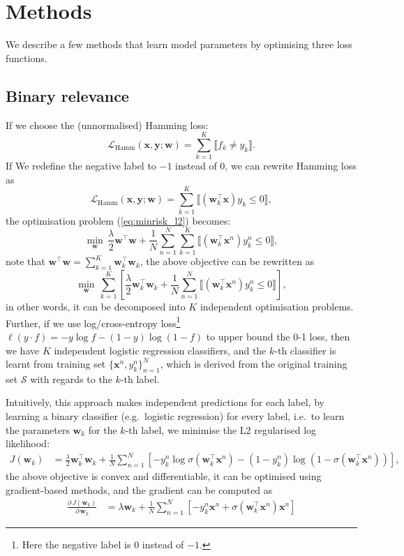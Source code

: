 \documentclass[9pt]{extarticle}
\newcommand{\llb}{\llbracket}
\newcommand{\rrb}{\rrbracket}
\newcommand{\x}{\mathbf{x}}
\newcommand{\y}{\mathbf{y}}
\newcommand{\1}{\mathbf{1}}
\newcommand{\w}{\mathbf{w}}
\newcommand{\LCal}{\mathcal{L}}
\newcommand{\SCal}{\mathcal{S}}
\newcommand{\eg}{e.g.\ }
\newcommand{\ie}{i.e.\ }
\begin{document}
\section{Methods}
We describe a few methods that learn model parameters by optimising three loss functions.

\subsection{Binary relevance}
\label{ssec:br}

If we choose the (unnormalised) Hamming loss:
$$
\LCal_\text{Hamm}(\x, \y; \w) = \sum_{k=1}^K \llb f_k \neq y_k \rrb.
$$
If We redefine the negative label to $-1$ instead of $0$, we can rewrite Hamming loss as
$$
\LCal_\text{Hamm}(\x, \y; \w) = \sum_{k=1}^K \llb (\w_k^\top \x) y_k \le 0 \rrb,
$$
the optimisation problem (\ref{eq:minrisk_l2}) becomes:
$$
\min_\w \, \frac{\lambda}{2} \w^\top \w + \frac{1}{N} \sum_{n=1}^N \sum_{k=1}^K \llb (\w_k^\top \x^n) y_k^n \le 0 \rrb,
$$
note that $\w^\top \w = \sum_{k=1}^K \w_k^\top \w_k$, the above objective can be rewritten as
$$
\min_\w \, \sum_{k=1}^K \left[ \frac{\lambda}{2} \w_k^\top \w_k + \frac{1}{N} \sum_{n=1}^N \llb (\w_k^\top \x^n) y_k^n \le 0 \rrb \right],
$$
in other words, it can be decomposed into $K$ independent optimisation problems.
Further, if we use log/cross-entropy loss\footnote{Here the negative label is $0$ instead of $-1$.}
$\ell(y \cdot f) = -y\log f - (1-y)\log(1 - f)$ 
to upper bound the 0-1 loss, then we have $K$ independent logistic regression classifiers,
and the $k$-th classifier is learnt from training set $\{\x^n, y_k^n\}_{n=1}^N$, 
which is derived from the original training set $\SCal$ with regards to the $k$-th label.

Intuitively, this approach makes independent predictions for each label, by learning a binary classifier (\eg logistic regression) for every label,
\ie to learn the parameters $\w_k$ for the $k$-th label, we minimise the L2 regularised log likelihood:
\begin{align*}
J(\w_k) 
&= \frac{\lambda}{2} \w_k^\top \w_k + 
   \frac{1}{N} \sum_{n=1}^N \left[ -y_k^n \log \sigma(\w_k^\top \x^n) - (1 - y_k^n) \log (1 - \sigma(\w_k^\top \x^n)) \right],
\end{align*}
the above objective is convex and differentiable, it can be optimised using gradient-based methods, 
and the gradient can be computed as
\begin{align*}
\frac{\partial \, J(\w_k)} {\partial \, \w_k} 
&= \lambda \w_k + \frac{1}{N} \sum_{n=1}^N \left[ -y_k^n \x^n + \sigma(\w_k^\top \x^n) \x^n \right]
\end{align*}
\end{document}
